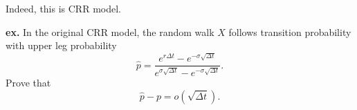 \documentclass{article}
\begin{document}
Indeed, this is CRR model. 

{\bf ex.}
In the original CRR model, the random walk $X$ follows transition probability 
with upper leg probability 
$$\hat p = \frac{e^{r\Delta t} - e^{-\sigma \sqrt{\Delta t}}}
{e^{\sigma \sqrt{\Delta t}} - e^{-\sigma \sqrt{\Delta t}}}.$$
Prove that 
$$\hat p - p = o(\sqrt{\Delta t}).$$
\end{document}
